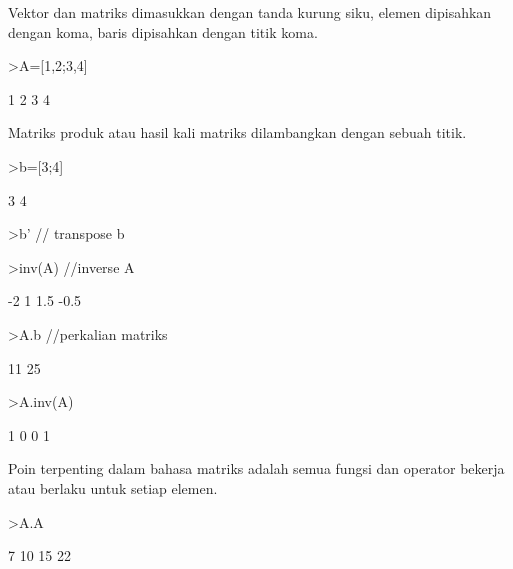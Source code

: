 \documentclass{article}
\begin{document}
\begin{eulernotebook}
\begin{eulercomment}
Vektor dan matriks dimasukkan dengan tanda kurung siku, elemen
dipisahkan dengan koma, baris dipisahkan dengan titik koma.
\end{eulercomment}
\begin{eulerprompt}
>A=[1,2;3,4]
\end{eulerprompt}
\begin{euleroutput}
              1             2 
              3             4 
\end{euleroutput}
\begin{eulercomment}
Matriks produk atau hasil kali matriks dilambangkan dengan sebuah
titik.
\end{eulercomment}
\begin{eulerprompt}
>b=[3;4]
\end{eulerprompt}
\begin{euleroutput}
              3 
              4 
\end{euleroutput}
\begin{eulerprompt}
>b' // transpose b
\end{eulerprompt}
\begin{euleroutput}
  [3,  4]
\end{euleroutput}
\begin{eulerprompt}
>inv(A) //inverse A
\end{eulerprompt}
\begin{euleroutput}
             -2             1 
            1.5          -0.5 
\end{euleroutput}
\begin{eulerprompt}
>A.b //perkalian matriks
\end{eulerprompt}
\begin{euleroutput}
             11 
             25 
\end{euleroutput}
\begin{eulerprompt}
>A.inv(A)
\end{eulerprompt}
\begin{euleroutput}
              1             0 
              0             1 
\end{euleroutput}
\begin{eulercomment}
Poin terpenting dalam bahasa matriks adalah semua fungsi dan operator
bekerja atau berlaku untuk setiap elemen.
\end{eulercomment}
\begin{eulerprompt}
>A.A
\end{eulerprompt}
\begin{euleroutput}
              7            10 
             15            22 

\end{euleroutput}
\end{eulernotebook}
\end{document}
